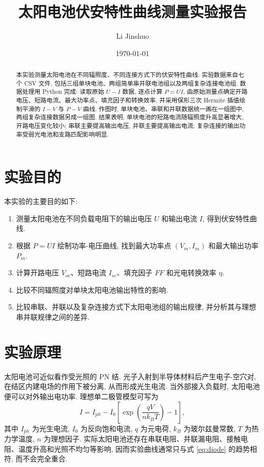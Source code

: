 \documentclass[UTF8,a4paper,12pt]{ctexart}
\title{太阳电池伏安特性曲线测量实验报告}
\author{Li Jinshuo}
\date{\today}
\begin{document}
\maketitle

\begin{abstract}
本实验测量太阳电池在不同辐照度、不同连接方式下的伏安特性曲线. 实验数据来自七个 CSV 文件, 包括三组单块电池、两组简单串并联电池组以及两组复杂连接电池组. 数据处理用 Python 完成: 读取原始 $U-I$ 数据, 逐点计算 $P=UI$, 由原始测量点确定开路电压、短路电流、最大功率点、填充因子和转换效率, 并采用保形三次 Hermite 插值绘制平滑的 $I-V$ 与 $P-V$ 曲线. 作图时, 单块电池、串联和并联数据统一画在一组图中, 两组复杂连接数据另成一组图. 结果表明, 单块电池的短路电流随辐照度升高显著增大, 开路电压变化较小; 串联主要提高输出电压, 并联主要提高输出电流; 复杂连接的输出功率受弱光电池和支路匹配影响明显.
\end{abstract}

\section{实验目的}

本实验的主要目的如下:
\begin{enumerate}
    \item 测量太阳电池在不同负载电阻下的输出电压 $U$ 和输出电流 $I$, 得到伏安特性曲线.
    \item 根据 $P=UI$ 绘制功率-电压曲线, 找到最大功率点 $(V_m,I_m)$ 和最大输出功率 $P_m$.
    \item 计算开路电压 $V_{oc}$、短路电流 $I_{sc}$、填充因子 $FF$ 和光电转换效率 $\eta$.
    \item 比较不同辐照度对单块太阳电池输出特性的影响.
    \item 比较串联、并联以及复杂连接方式下太阳电池组的输出规律, 并分析其与理想串并联规律之间的差异.
\end{enumerate}

\section{实验原理}

太阳电池可近似看作受光照的 PN 结. 光子入射到半导体材料后产生电子-空穴对, 在结区内建电场的作用下被分离, 从而形成光生电流. 当外部接入负载时, 太阳电池便可以对外输出电功率. 理想单二极管模型可写为
\begin{equation}
    I = I_{ph} - I_0\left[\exp\left(\frac{qV}{n k_B T}\right)-1\right],
    \label{eq:diode}
\end{equation}
其中 $I_{ph}$ 为光生电流, $I_0$ 为反向饱和电流, $q$ 为元电荷, $k_B$ 为玻尔兹曼常数, $T$ 为热力学温度, $n$ 为理想因子. 实际太阳电池还存在串联电阻、并联漏电阻、接触电阻、温度升高和光照不均匀等影响, 因而实验曲线通常只与式 \eqref{eq:diode} 的趋势相符, 而不会完全重合.
\end{document}
